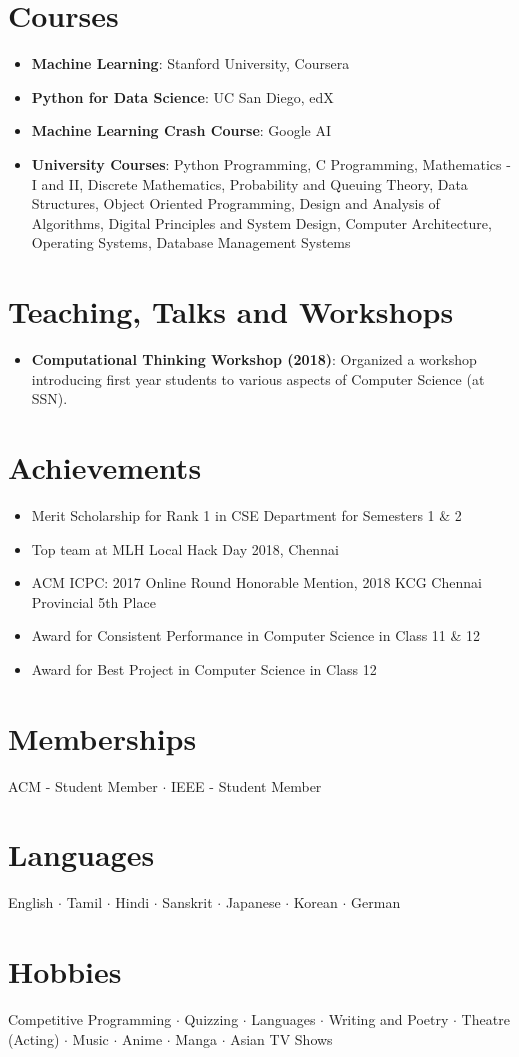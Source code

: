 \documentclass[letterpaper,11pt]{article}
\newcommand{\resumeItem}[2]{
\item\small{
\textbf{#1}{: #2 \vspace{-2pt}}
}
}
\newcommand{\resumeSubHeadingListStart}{\begin{itemize}[leftmargin=*]}
\newcommand{\resumeSubHeadingListEnd}{\end{itemize}}
\begin{document}
\section{Courses}
\resumeSubHeadingListStart
\resumeItem{Machine Learning}{Stanford University, Coursera}
\resumeItem{Python for Data Science}{UC San Diego, edX}
\resumeItem{Machine Learning Crash Course}{Google AI}
\resumeItem{University Courses}{Python Programming, C Programming, Mathematics - I and II, Discrete Mathematics, Probability and Queuing Theory, Data Structures, Object Oriented Programming, Design and Analysis of Algorithms, Digital Principles and System Design, Computer Architecture, Operating Systems, Database Management Systems}
\resumeSubHeadingListEnd

\section{Teaching, Talks and Workshops}
\resumeSubHeadingListStart
\resumeItem{Computational Thinking Workshop (2018)}{Organized a workshop introducing first year students to various aspects of Computer Science (at SSN).}
\resumeSubHeadingListEnd

\section{Achievements}
\begin{itemize}[leftmargin=*]
\item Merit Scholarship for Rank 1 in CSE Department for Semesters 1 \& 2
\item Top team at MLH Local Hack Day 2018, Chennai
\item ACM ICPC: 2017 Online Round Honorable Mention, 2018 KCG Chennai Provincial 5th Place
\item Award for Consistent Performance in Computer Science in Class 11 \& 12
\item Award for Best Project in Computer Science in Class 12
\end{itemize}

\section{Memberships}
ACM - Student Member $\cdot$ IEEE - Student Member

\section{Languages}
English $\cdot$ Tamil $\cdot$ Hindi $\cdot$ Sanskrit $\cdot$ Japanese $\cdot$ Korean $\cdot$ German

\section{Hobbies}
Competitive Programming $\cdot$ Quizzing $\cdot$ Languages $\cdot$ Writing and Poetry $\cdot$ Theatre (Acting) $\cdot$ Music $\cdot$ Anime $\cdot$ Manga $\cdot$ Asian TV Shows

\end{document}
